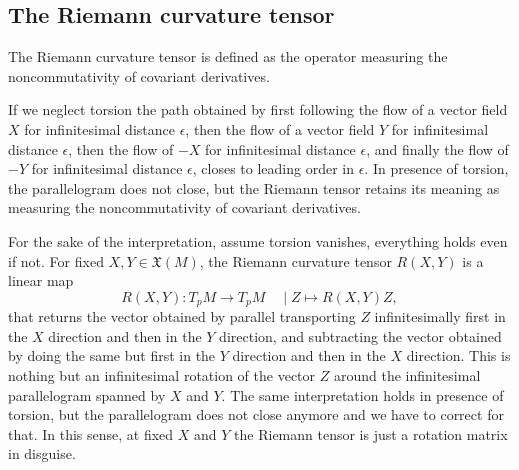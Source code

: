 \subsection{The Riemann curvature tensor}

The Riemann curvature tensor is defined as the operator measuring the noncommutativity of covariant derivatives.

\begin{mytheorem}
If we neglect torsion the path obtained by first following the flow of a vector field \(X\) for infinitesimal distance \(\epsilon\), then the flow of a vector field \(Y\) for infinitesimal distance \(\epsilon\), then the flow of \(-X\) for infinitesimal distance \(\epsilon\), and finally the flow of \(-Y\) for infinitesimal distance \(\epsilon\), closes to leading order in \(\epsilon\).
In presence of torsion, the parallelogram does not close, but the Riemann tensor retains its meaning as measuring the noncommutativity of covariant derivatives.
\end{mytheorem}

\begin{mytheorem}
For the sake of the interpretation, assume torsion vanishes, everything holds even if not.
For fixed $X,Y\in \mathfrak{X}(M)$, the Riemann curvature tensor \(R(X,Y)\) is a linear map
\begin{equation}
    R(X,Y): T_p M \to T_p M \quad \mid Z\mapsto R(X,Y)Z,
\end{equation}
that returns the vector obtained by parallel transporting \(Z\) infinitesimally first in the $X$ direction and then in the $Y$ direction, and subtracting the vector obtained by doing the same but first in the $Y$ direction and then in the $X$ direction.
This is nothing but an infinitesimal rotation of the vector \(Z\) around the infinitesimal parallelogram spanned by \(X\) and \(Y\).
The same interpretation holds in presence of torsion, but the parallelogram does not close anymore and we have to correct for that.
In this sense, at fixed $X$ and $Y$ the Riemann tensor is just a rotation matrix in disguise.
%
\end{mytheorem}




